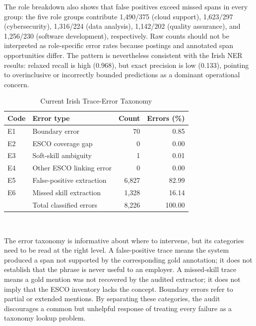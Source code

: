 \documentclass[conference]{IEEEtran}
\begin{document}
The role breakdown also shows that false positives exceed missed spans in every group: the five role groups contribute 1,490/375 (cloud support), 1,623/297 (cybersecurity), 1,316/224 (data analysis), 1,142/202 (quality assurance), and 1,256/230 (software development), respectively. Raw counts should not be interpreted as role-specific error rates because postings and annotated span opportunities differ. The pattern is nevertheless consistent with the Irish NER results: relaxed recall is high (0.968), but exact precision is low (0.133), pointing to overinclusive or incorrectly bounded predictions as a dominant operational concern.

\begin{table}[!t]
\caption{Current Irish Trace-Error Taxonomy}
\label{tab:error-taxonomy}
\centering
\small
\begin{tabular}{llrr}
\toprule
Code & Error type & Count & Errors (\%) \\
\midrule
E1 & Boundary error & 70 & 0.85 \\
E2 & ESCO coverage gap & 0 & 0.00 \\
E3 & Soft-skill ambiguity & 1 & 0.01 \\
E4 & Other ESCO linking error & 0 & 0.00 \\
E5 & False-positive extraction & 6,827 & 82.99 \\
E6 & Missed skill extraction & 1,328 & 16.14 \\
\midrule
 & Total classified errors & 8,226 & 100.00 \\
\bottomrule
\end{tabular}
\\[1mm]
\par\vspace{1mm}{\footnotesize Percentages use the 8,226 classified errors; five additional trace records are marked correct. Source: current Irish trace audit.}
\end{table}

The error taxonomy is informative about where to intervene, but its categories need to be read at the right level. A false-positive trace means the system produced a span not supported by the corresponding gold annotation; it does not establish that the phrase is never useful to an employer. A missed-skill trace means a gold mention was not recovered by the audited extractor; it does not imply that the ESCO inventory lacks the concept. Boundary errors refer to partial or extended mentions. By separating these categories, the audit discourages a common but unhelpful response of treating every failure as a taxonomy lookup problem.
\end{document}
